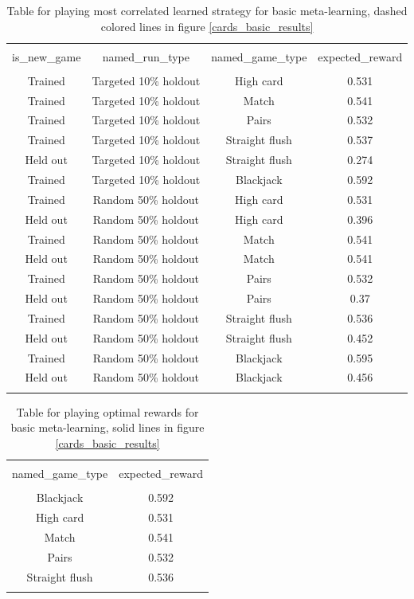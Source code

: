 \documentclass{article}
\begin{document}
\begin{table}[H]
\scriptsize
\centering
\begin{tabular}{@{\extracolsep{5pt}} cccc}
\\[-1.8ex]\hline
\hline \\[-1.8ex]
is\_new\_game & named\_run\_type & named\_game\_type & expected\_reward \\
\hline \\[-1.8ex]
Trained & Targeted 10\% holdout & High card & 0.531 \\
Trained & Targeted 10\% holdout & Match & 0.541 \\
Trained & Targeted 10\% holdout & Pairs & 0.532 \\
Trained & Targeted 10\% holdout & Straight flush & 0.537 \\
Held out & Targeted 10\% holdout & Straight flush & 0.274 \\
Trained & Targeted 10\% holdout & Blackjack & 0.592 \\
Trained & Random 50\% holdout & High card & 0.531 \\
Held out & Random 50\% holdout & High card & 0.396 \\
Trained & Random 50\% holdout & Match & 0.541 \\
Held out & Random 50\% holdout & Match & 0.541 \\
Trained & Random 50\% holdout & Pairs & 0.532 \\
Held out & Random 50\% holdout & Pairs & 0.37 \\
Trained & Random 50\% holdout & Straight flush & 0.536 \\
Held out & Random 50\% holdout & Straight flush & 0.452 \\
Trained & Random 50\% holdout & Blackjack & 0.595 \\
Held out & Random 50\% holdout & Blackjack & 0.456 \\
\hline \\[-1.8ex]
\end{tabular}
\caption{Table for playing most correlated learned strategy for basic meta-learning, dashed colored lines in figure \ref{cards_basic_results}}
\end{table}

\begin{table}[H]
\scriptsize
\centering
\begin{tabular}{@{\extracolsep{5pt}} cc}
\\[-1.8ex]\hline
\hline \\[-1.8ex]
named\_game\_type & expected\_reward \\
\hline \\[-1.8ex]
Blackjack & 0.592 \\
High card & 0.531 \\
Match & 0.541 \\
Pairs & 0.532 \\
Straight flush & 0.536 \\
\hline \\[-1.8ex]
\end{tabular}
\caption{Table for playing optimal rewards for basic meta-learning, solid lines in figure \ref{cards_basic_results}}
\end{table}
\end{document}
